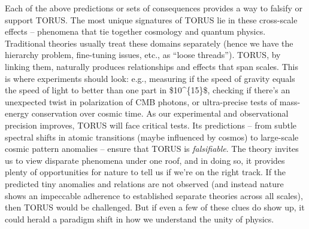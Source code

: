 \documentclass[
]{article}
\begin{document}
Each of the above predictions or sets of consequences provides a way to
falsify or support TORUS. The most unique signatures of TORUS lie in
these cross-scale effects -- phenomena that tie together cosmology and
quantum physics. Traditional theories usually treat these domains
separately (hence we have the hierarchy problem, fine-tuning issues,
etc., as ``loose threads''). TORUS, by linking them, naturally produces
relationships and effects that span scales. This is where experiments
should look: e.g., measuring if the speed of gravity equals the speed of
light to better than one part in \$10\^{}\{15\}\$, checking if there's
an unexpected twist in polarization of CMB photons, or ultra-precise
tests of mass-energy conservation over cosmic time. As our experimental
and observational precision improves, TORUS will face critical tests.
Its predictions -- from subtle spectral shifts in atomic transitions
(maybe influenced by cosmos) to large-scale cosmic pattern anomalies --
ensure that TORUS is \emph{falsifiable}. The theory invites us to view
disparate phenomena under one roof, and in doing so, it provides plenty
of opportunities for nature to tell us if we're on the right track. If
the predicted tiny anomalies and relations are not observed (and instead
nature shows an impeccable adherence to established separate theories
across all scales), then TORUS would be challenged. But if even a few of
these clues do show up, it could herald a paradigm shift in how we
understand the unity of physics.
\end{document}
